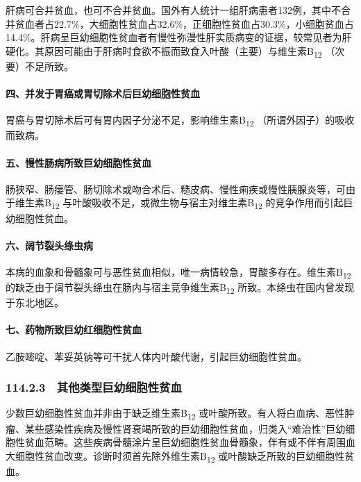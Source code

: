 肝病可合并贫血，也可不合并贫血。国外有人统计一组肝病患者132例，其中不合并贫血者占22.7\%，大细胞性贫血占32.6\%，正细胞性贫血占30.3\%，小细胞贫血占14.4\%。肝病呈巨幼细胞性贫血者有慢性弥漫性肝实质病变的证据，较常见者为肝硬化。其原因可能由于肝病时食欲不振而致食入叶酸（主要）与维生素B\textsubscript{12}
（次要）不足所致。

\paragraph{四、并发于胃癌或胃切除术后巨幼细胞性贫血}

胃癌与胃切除术后可有胃内因子分泌不足，影响维生素B\textsubscript{12}
（所谓外因子）的吸收而致病。

\paragraph{五、慢性肠病所致巨幼细胞性贫血}

肠狭窄、肠瘘管、肠切除术或吻合术后、糙皮病、慢性痢疾或慢性胰腺炎等，可由于维生素B\textsubscript{12}
与叶酸吸收不足，或微生物与宿主对维生素B\textsubscript{12}
的竞争作用而引起巨幼细胞性贫血。

\paragraph{六、阔节裂头绦虫病}

本病的血象和骨髓象可与恶性贫血相似，唯一病情较急，胃酸多存在。维生素B\textsubscript{12}
的缺乏由于阔节裂头绦虫在肠内与宿主竞争维生素B\textsubscript{12}
所致。本绦虫在国内曾发现于东北地区。

\paragraph{七、药物所致巨幼红细胞性贫血}

乙胺嘧啶、苯妥英钠等可干扰人体内叶酸代谢，引起巨幼细胞性贫血。

\subsubsection{114.2.3　其他类型巨幼细胞性贫血}

少数巨幼细胞性贫血并非由于缺乏维生素B\textsubscript{12}
或叶酸所致。有人将白血病、恶性肿瘤、某些感染性疾病及慢性肾衰竭所致的巨幼细胞性贫血，归类入“难治性”巨幼细胞性贫血范畴。这些疾病骨髓涂片呈巨幼细胞性贫血骨髓象，伴有或不伴有周围血大细胞性贫血改变。诊断时须首先除外维生素B\textsubscript{12}
或叶酸缺乏所致的巨幼细胞性贫血。

